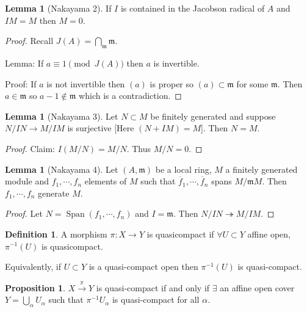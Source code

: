 \documentclass{article}
\theoremstyle{definition}
\newtheorem*{definition}{Definition}
\newtheorem{proposition}[theorem]{Proposition}
\newtheorem{lemma}[theorem]{Lemma}
\begin{document}
    \begin{lemma}
        [Nakayama 2] If \(I\) is contained in the Jacobson radical of \(A\) and \(I M = M\) then \(M=0\).
    \end{lemma}

    \begin{proof}
        Recall \(J(A) = \bigcap_{\mathfrak{m}} \mathfrak{m}\).

        Lemma: If \(a\equiv 1 \pmod{J(A)}\) then \(a\) is invertible.

        Proof: If \(a\) is not invertible then \((a)\) is proper so \((a) \subset \mathfrak{m} \) for some \(\mathfrak{m}\). Then \(a\in \mathfrak{m} \) so \(a-1 \notin \mathfrak{m}\) which is a contradiction.
    \end{proof}

    \begin{lemma}
        [Nakayama 3]
        Let \(N \subset M\) be finitely generated and suppose \(N / IN \to M / IM\) is surjective [Here \((N + IM) = M\)]. Then \(N = M\). 
    \end{lemma}

    \begin{proof}
        Claim: \(I(M / N) = M / N\). Thus \(M / N = 0\).
    \end{proof}

    \begin{lemma}
        [Nakayama 4] Let \((A, \mathfrak{m})\) be a local ring, \(M\) a finitely generated module and \(f_1 , \cdots , f_n\) elements of \(M\) such that \(\overline{f}_1 , \cdots , \overline{f}_n \) spans \(M / \mathfrak{m} M\). Then \(f_1 , \cdots , f_n\) generate \(M\). 
    \end{lemma}

    \begin{proof}
        Let \(N = \operatorname{Span}(f_1 , \cdots , f_n)\) and \(I = \mathfrak{m}\). Then \(N / IN \twoheadrightarrow M / IM\).
    \end{proof}

    \begin{definition}
        A morphism \(\pi: X \to Y\) is quasicompact if \(\forall U \subset Y\) affine open, \(\pi ^{-1} (U)\) is quasicompact.
    \end{definition}

    Equivalently, if \(U \subset Y\) is a quasi-compact open then \(\pi ^{-1} (U)\) is quasi-compact.

    \begin{proposition}
        \(X \xrightarrow{\pi} Y\) is quasi-compact if and only if \(\exists\) an affine open cover \(Y = \bigcup_{\alpha} U_\alpha\) such that \(\pi ^{-1} U_\alpha\) is quasi-compact for all \(\alpha\).
    \end{proposition}
\end{document}
